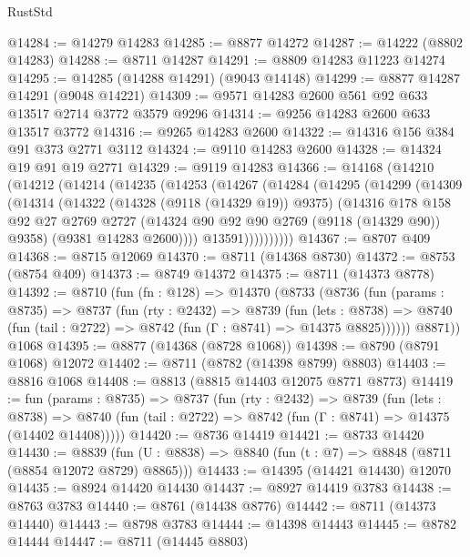 \begin{lexlean}{RustStd}
\begin{coremodule}
@14284 := @14279 @14283
@14285 := @8877 @14272
@14287 := @14222 (@8802 @14283)
@14288 := @8711 @14287
@14291 := @8809 @14283 @11223 @14274
@14295 := @14285 (@14288 @14291) (@9043 @14148)
@14299 := @8877 @14287 @14291 (@9048 @14221)
@14309 := @9571 @14283 @2600 @561 @92 @633 @13517 @2714 @3772 @3579 @9296
@14314 := @9256 @14283 @2600 @633 @13517 @3772
@14316 := @9265 @14283 @2600
@14322 := @14316 @156 @384 @91 @373 @2771 @3112
@14324 := @9110 @14283 @2600
@14328 := @14324 @19 @91 @19 @2771
@14329 := @9119 @14283
@14366 := @14168
    (@14210
      (@14212
        (@14214
          (@14235
            (@14253
              (@14267
                (@14284
                  (@14295
                    (@14299
                      (@14309
                        (@14314
                          (@14322
                            (@14328 (@9118 (@14329 @19)) @9375)
                            (@14316
                              @178
                              @158
                              @92
                              @27
                              @2769
                              @2727
                              (@14324 @90 @92 @90 @2769 (@9118 (@14329 @90)) @9358)
                              (@9381 @14283 @2600))))
                        @13591))))))))))
@14367 := @8707 @409
@14368 := @8715 @12069
@14370 := @8711 (@14368 @8730)
@14372 := @8753 (@8754 @409)
@14373 := @8749 @14372
@14375 := @8711 (@14373 @8778)
@14392 := @8710
    (fun (fn : @128) =>
    @14370
      (@8733
        (@8736
          (fun (params : @8735) =>
          @8737
            (fun (rty : @2432) =>
            @8739
              (fun (lets : @8738) =>
              @8740 (fun (tail : @2722) => @8742 (fun (Γ : @8741) => @14375 @8825))))))
        @8871))
    @1068
@14395 := @8877 (@14368 (@8728 @1068))
@14398 := @8790 (@8791 @1068) @12072
@14402 := @8711 (@8782 (@14398 @8799) @8803)
@14403 := @8816 @1068
@14408 := @8813 (@8815 @14403 @12075 @8771 @8773)
@14419 := fun (params : @8735) =>
  @8737
    (fun (rty : @2432) =>
    @8739
      (fun (lets : @8738) =>
      @8740 (fun (tail : @2722) => @8742 (fun (Γ : @8741) => @14375 (@14402 @14408)))))
@14420 := @8736 @14419
@14421 := @8733 @14420
@14430 := @8839
    (fun (U : @8838) => @8840 (fun (t : @7) => @8848 (@8711 (@8854 @12072 @8729) @8865)))
@14433 := @14395 (@14421 @14430) @12070
@14435 := @8924 @14420 @14430
@14437 := @8927 @14419 @3783
@14438 := @8763 @3783
@14440 := @8761 (@14438 @8776)
@14442 := @8711 (@14373 @14440)
@14443 := @8798 @3783
@14444 := @14398 @14443
@14445 := @8782 @14444
@14447 := @8711 (@14445 @8803)

\end{coremodule}
\end{lexlean}
